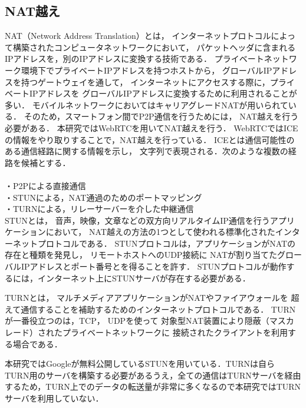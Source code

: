 \documentclass[sotsuron]{jcsie}
\begin{document}
\subsection{NAT越え}
NAT（Network Address Translation）とは，
インターネットプロトコルによって構築されたコンピュータネットワークにおいて，
パケットヘッダに含まれるIPアドレスを，別のIPアドレスに変換する技術である．
プライベートネットワーク環境下でプライベートIPアドレスを持つホストから，
グローバルIPアドレスを持つゲートウェイを通して，
インターネットにアクセスする際に，プライベートIPアドレスを
グローバルIPアドレスに変換するために利用されることが多い．
モバイルネットワークにおいてはキャリアグレードNATが用いられている．
そのため，スマートフォン間でP2P通信を行うためには，
NAT越えを行う必要がある．
本研究ではWebRTCを用いてNAT越えを行う．
WebRTCではICEの情報をやり取りすることで，NAT越えを行っている．
ICEとは通信可能性のある通信経路に関する情報を示し，
文字列で表現される．次のような複数の経路を候補とする．\\\\
・P2Pによる直接通信\\
・STUNによる，NAT通過のためのポートマッピング\\
・TURNによる，リレーサーバーを介した中継通信\\

STUN\cite{wing2008session}とは，
音声，映像，文章などの双方向リアルタイムIP通信を行うアプリケーションにおいて，
NAT越えの方法の1つとして使われる標準化されたインターネットプロトコルである．
STUNプロトコルは，アプリケーションがNATの存在と種類を発見し，
リモートホストへのUDP接続に
NATが割り当てたグローバルIPアドレスとポート番号とを得ることを許す．
STUNプロトコルが動作するには，インターネット上にSTUNサーバが存在する必要がある．

TURN\cite{matthews2010traversal}とは，
マルチメディアアプリケーションがNATやファイアウォールを
超えて通信することを補助するためのインターネットプロトコルである．
TURNが一番役立つのは，TCP， UDPを使って
対象型NAT装置により隠蔽（マスカレード）されたプライベートネットワークに
接続されたクライアントを利用する場合である．

本研究ではGoogleが無料公開しているSTUNを用いている．TURNは自ら
TURN用のサーバを構築する必要があるうえ，全ての通信はTURNサーバを経由
するため，TURN上でのデータの転送量が非常に多くなるので本研究ではTURN
サーバを利用していない．
\end{document}
